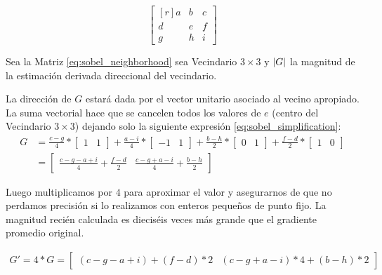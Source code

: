\documentclass[pregrado]{tesis-usb} %
\DeclarePairedDelimiter\abs{\lvert}{\rvert}%
\begin{document}
\begin{equation}
\begin{bmatrix*}[r]\label{eq:sobel_neighborhood}
a & b & c \\
d & e & f \\
g & h & i
\end{bmatrix*}
\end{equation}

Sea la Matriz \ref{eq:sobel_neighborhood} sea Vecindario $3\times 3$ y $\abs*{G}$ la magnitud de la estimación derivada direccional del vecindario.

La dirección de $G$ estará dada por el vector unitario asociado al vecino apropiado. La suma vectorial hace que se cancelen todos los valores de $e$ (centro del  Vecindario $3\times 3$) dejando solo la siguiente expresión \ref{eq:sobel_simplification}:
\begin{equation}\label{eq:sobel_simplification}
\begin{split}
	G & =\frac{c-g}{4}*\begin{bmatrix*}1 & 1\end{bmatrix*}+\frac{a-i}{4}*\begin{bmatrix*}-1 & 1\end{bmatrix*}+\frac{b-h}{2}*\begin{bmatrix*}0 & 1\end{bmatrix*}+\frac{f-d}{2}*\begin{bmatrix*}1 & 0\end{bmatrix*} \\ & =\begin{bmatrix*}\frac{c-g-a+i}{4}+\frac{f-d}{2} & \frac{c-g+a-i}{4}+\frac{b-h}{2}\end{bmatrix*}
\end{split}
\end{equation}

Luego multiplicamos por $4$ para aproximar el valor y asegurarnos de que no perdamos precisión si lo realizamos con enteros pequeños de punto fijo. La magnitud recién calculada es dieciséis veces más grande que el gradiente promedio original.

\begin{equation}\label{eq:sobel_approximation}
\begin{split}
G' = 4 * G =\begin{bmatrix*}(c-g-a+i)+(f-d)*2 & (c-g+a-i)*4+(b-h)*2\end{bmatrix*}
\end{split}
\end{equation}
\end{document}
